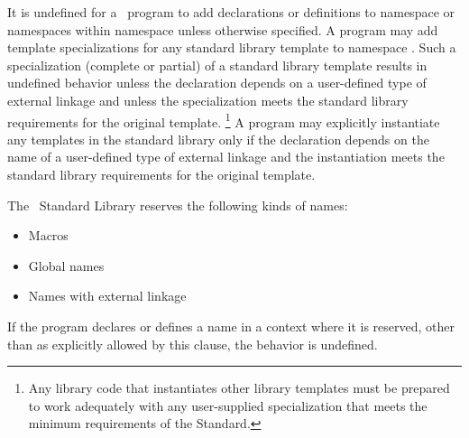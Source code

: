 \documentclass[american,twoside]{book}
\begin{document}
\pnum
It is undefined for a \Cpp\ program to add declarations or definitions to namespace
or namespaces within namespace
unless otherwise specified.
A program may add template specializations for any standard library template
to namespace
.
Such a specialization  (complete or partial) of a standard library
template results in undefined behavior unless the declaration
depends on a user-defined type of external linkage
and unless the specialization meets the standard library requirements
for the original template.%
\footnote{
Any library code that instantiates other library templates
must be prepared to work adequately with any user-supplied specialization
that meets the minimum requirements of the Standard.
}
A program may explicitly instantiate any templates in the standard library
only if the declaration depends on the name of a user-defined type of external
linkage and the instantiation meets the standard library requirements for the
original template.

\pnum
The \Cpp\ Standard Library reserves the following kinds of names:
\begin{itemize}
\item
Macros
\item
Global names
\item
Names with external linkage
\end{itemize}

\pnum
If the program declares or defines a name in a context where it is
reserved, other than as explicitly allowed by this clause, the behavior is
undefined.
%

\color{black}


\end{document}
